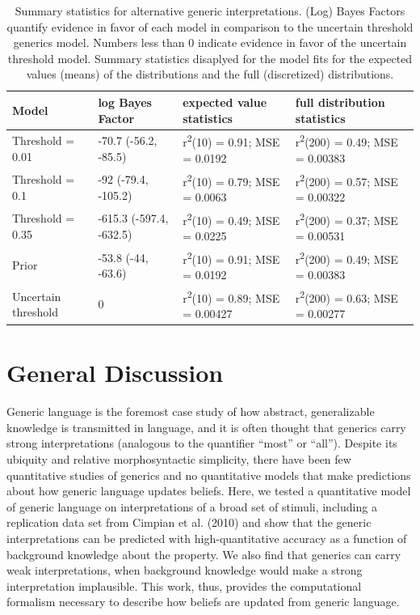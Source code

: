 \documentclass[,man,floatsintext]{apa6}
\theoremstyle{definition}
\theoremstyle{definition}
\theoremstyle{definition}
\theoremstyle{remark}
\begin{document}
\begin{table}[H]
\centering
\begingroup\fontsize{9pt}{10pt}\selectfont
\begin{tabular}{llll}
  \hline
Model & log Bayes Factor & expected value statistics & full distribution statistics \\ 
  \hline
Threshold = 0.01 & -70.7 (-56.2, -85.5) & r\textsuperscript{2}(10) = 0.91; MSE = 0.0192 & r\textsuperscript{2}(200) = 0.49; MSE = 0.00383 \\ 
  Threshold = 0.1 & -92 (-79.4, -105.2) & r\textsuperscript{2}(10) = 0.79; MSE = 0.0063 & r\textsuperscript{2}(200) = 0.57; MSE = 0.00322 \\ 
  Threshold = 0.35 & -615.3 (-597.4, -632.5) & r\textsuperscript{2}(10) = 0.49; MSE = 0.0225 & r\textsuperscript{2}(200) = 0.37; MSE = 0.00531 \\ 
  Prior & -53.8 (-44, -63.6) & r\textsuperscript{2}(10) = 0.91; MSE = 0.0192 & r\textsuperscript{2}(200) = 0.49; MSE = 0.00383 \\ 
  Uncertain threshold & 0 & r\textsuperscript{2}(10) = 0.89; MSE = 0.00427 & r\textsuperscript{2}(200) = 0.63; MSE = 0.00277 \\ 
   \hline
\end{tabular}
\endgroup
\caption{Summary statistics for alternative generic interpretations. (Log) Bayes Factors quantify evidence in favor of each model in comparison to the uncertain threshold generics model. Numbers less than 0 indicate evidence in favor of the uncertain threshold model. Summary statistics disaplyed for the model fits for the expected values (means) of the distributions and the full (discretized) distributions.} 
\end{table}

\section{General Discussion}\label{general-discussion}

Generic language is the foremost case study of how abstract,
generalizable knowledge is transmitted in language, and it is often
thought that generics carry strong interpretations (analogous to the
quantifier \enquote{most} or \enquote{all}). Despite its ubiquity and
relative morphosyntactic simplicity, there have been few quantitative
studies of generics and no quantitative models that make predictions
about how generic language updates beliefs. Here, we tested a
quantitative model of generic language on interpretations of a broad set
of stimuli, including a replication data set from Cimpian et al. (2010)
and show that the generic interpretations can be predicted with
high-quantitative accuracy as a function of background knowledge about
the property. We also find that generics can carry weak interpretations,
when background knowledge would make a strong interpretation
implausible. This work, thus, provides the computational formalism
necessary to describe how beliefs are updated from generic language.
\end{document}
